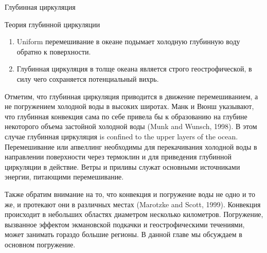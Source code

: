 \begin{chapter}{Глубинная циркуляция}
\begin{section}{Теория глубинной циркуляции}
\begin{enumerate}
\item 
Uniform перемешивание в океане подымает
холодную глубинную воду обратно к поверхности.
%

\item 
Глубинная циркуляция в толще океана является строго 
геострофической, 
в силу чего сохраняется потенциальный вихрь.
%
\end{enumerate}

Отметим, что глубинная циркуляция приводится
в движение перемешиванием, а не погружением
холодной воды в высоких широтах. Манк и Вюнш указывают, что глубинная конвекция
сама по себе привела бы к образованию на глубине некоторого объема застойной
холодной воды (Munk and Wunsch, 1998). В этом случае глубинная циркуляция
is confined to the upper layers of the ocean. Перемешивание или 
апвеллинг необходимы для перекачивания
холодной воды в направлении поверхности через 
термоклин
и для приведения глубинной циркуляции в действие. Ветры и приливы служат
основными источниками энергии, питающими 
перемешивание.
%

Также обратим внимание на то, что конвекция и погружение воды не одно и то же,
и протекают они в различных местах (Marotzke and Scott, 1999). Конвекция 
происходит в небольших областях диаметром несколько километров. Погружение,
вызванное эффектом экмановской подкачки 
и геострофическими течениями, может занимать гораздо большие регионы.
В данной главе мы обсуждаем в основном погружение.
%


\end{section}
\end{chapter}
